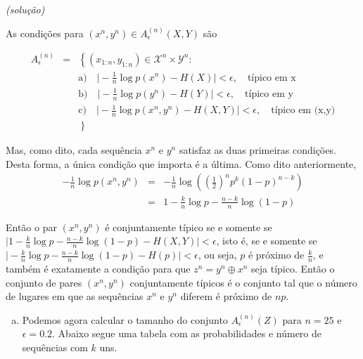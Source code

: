 \begin{frame}[allowframebreaks]
\begin{exercise}
  \examplebreak  
  
  \textit{(solução)}

  As condições para $(x^n, y^n) \in A_{\epsilon}^{(n)} (X,Y)$ são

  \begin{eqnarray}
  A_{\epsilon}^{(n)} &=& \left\{ (x_{1:n} , y_{1:n}) \in \mathcal{X}^n \times \mathcal{Y}^n : \right. \nonumber \\ 
                && \text{a)} \quad \vert - \frac{1}{n} \log p(x^n) - H(X) \vert < \epsilon , \quad \text{típico em x} \nonumber \\
                && \text{b)} \quad \vert - \frac{1}{n} \log p(y^n) - H(Y) \vert < \epsilon , \quad \text{típico em y} \nonumber \\
                && \text{c)} \quad \vert - \frac{1}{n} \log p(x^n,y^n) - H(X,Y) \vert < \epsilon , \quad \text{típico em (x,y)} \nonumber \\
                && \left. \right\} 
  \end{eqnarray}


  \examplebreak

  Mas, como dito, cada sequência $x^n$ e $y^n$ satisfaz as duas primeiras condições.
  Desta forma, a única condição que importa é a última. Como dito anteriormente,
  \begin{eqnarray}
  - \frac{1}{n} \log p(x^n, y^n) &=& - \frac{1}{n} \log \left( \left( \frac{1}{2} \right)^n p^k (1-p)^{n-k} \right) \nonumber \\
	&=& 1 - \frac{k}{n} \log p - \frac{n-k}{n} \log (1-p)
  \end{eqnarray}

  \examplebreak

  Então o par $(x^n, y^n)$ é conjuntamente típico se e somente se
  $\vert 1 - \frac{k}{n} \log p - \frac{n-k}{n} \log (1-p) - H(X,Y) \vert < \epsilon$,
  isto é, se e somente se $\vert - \frac{k}{n} \log p - \frac{n-k}{n} \log (1-p) - H(p) \vert < \epsilon$, ou seja, $p$ é próximo de $\frac{k}{n}$,
  e também é exatamente a condição para que $z^n = y^n \oplus x^n$ seja típico.
  Então o conjunto de pares $(x^n,y^n)$ conjuntamente típicos é o conjunto tal que o número
  de lugares em que as sequências $x^n$ e $y^n$ diferem é próximo de $np$.


  \examplebreak
  \begin{enumerate}[d)]
  \item Podemos agora calcular o tamanho do conjunto $A_{\epsilon}^{(n)}(Z)$ para $n=25$
  e $\epsilon = 0.2$. Abaixo segue uma tabela com as probabilidades e número de sequências
  com $k$ uns.
  \end{enumerate}


\end{exercise}
\end{frame}

